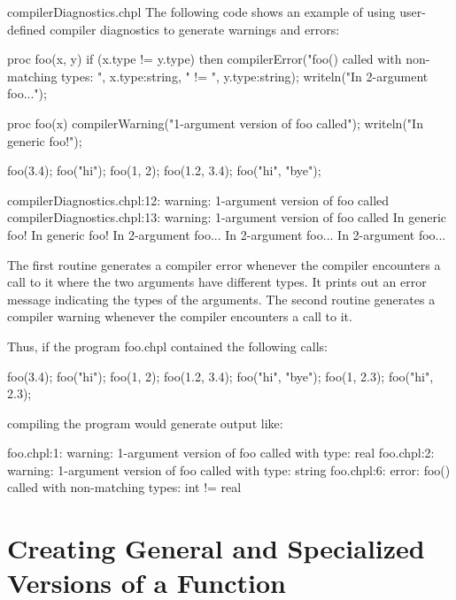 \begin{chapelexample}{compilerDiagnostics.chpl}
The following code shows an example of using user-defined compiler
diagnostics to generate warnings and errors:
\begin{chapel}
proc foo(x, y) {
  if (x.type != y.type) then
    compilerError("foo() called with non-matching types: ", 
                  x.type:string, " != ", y.type:string);
  writeln("In 2-argument foo...");
}

proc foo(x) {
  compilerWarning("1-argument version of foo called");
  writeln("In generic foo!");
}
\end{chapel}
\begin{chapelpost}
foo(3.4);
foo("hi");
foo(1, 2);
foo(1.2, 3.4);
foo("hi", "bye");
\end{chapelpost}
\begin{chapeloutput}
compilerDiagnostics.chpl:12: warning: 1-argument version of foo called
compilerDiagnostics.chpl:13: warning: 1-argument version of foo called
In generic foo!
In generic foo!
In 2-argument foo...
In 2-argument foo...
In 2-argument foo...
\end{chapeloutput}

The first routine generates a compiler error whenever the compiler
encounters a call to it where the two arguments have different types.
It prints out an error message indicating the types of the arguments.
The second routine generates a compiler warning whenever the compiler
encounters a call to it.

Thus, if the program foo.chpl contained the following calls:

\begin{numberedchapel}
foo(3.4);
foo("hi");
foo(1, 2);
foo(1.2, 3.4);
foo("hi", "bye");
foo(1, 2.3);
foo("hi", 2.3);
\end{numberedchapel}

\noindent compiling the program would generate output like:

\begin{commandline}
foo.chpl:1: warning: 1-argument version of foo called with type: real
foo.chpl:2: warning: 1-argument version of foo called with type: string
foo.chpl:6: error: foo() called with non-matching types: int != real
\end{commandline}

\end{chapelexample}

\section{Creating General and Specialized Versions of a Function}
\label{Creating_General_and_Specialized_Versions_of_a_Function}

